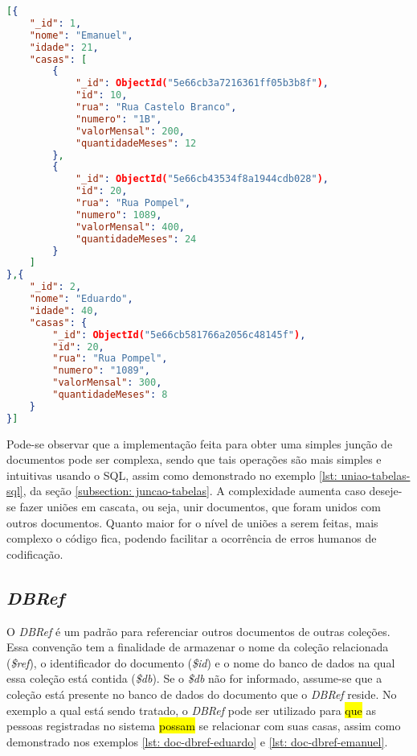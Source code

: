 
\begin{lstlisting}[language=json, caption={Resultado da Junção de Documentos sem Omissão\label{lst: resultado-juncao-lookup-sem-omissao}}]
[{
    "_id": 1,
    "nome": "Emanuel",
    "idade": 21,
    "casas": [
        {
            "_id": ObjectId("5e66cb3a7216361ff05b3b8f"),
            "id": 10,
            "rua": "Rua Castelo Branco",
            "numero": "1B",
            "valorMensal": 200,
            "quantidadeMeses": 12
        },
        {
            "_id": ObjectId("5e66cb43534f8a1944cdb028"),
            "id": 20,
            "rua": "Rua Pompel",
            "numero": 1089,
            "valorMensal": 400,
            "quantidadeMeses": 24
        }
    ]
},{
    "_id": 2,
    "nome": "Eduardo",
    "idade": 40,
    "casas": {
        "_id": ObjectId("5e66cb581766a2056c48145f"),
        "id": 20,
        "rua": "Rua Pompel",
        "numero": "1089",
        "valorMensal": 300,
        "quantidadeMeses": 8
    }
}]
\end{lstlisting}

Pode-se observar que a implementação feita para obter uma simples junção de documentos pode ser complexa, sendo que tais operações são mais simples e intuitivas usando o SQL, assim como demonstrado no exemplo \ref{lst: uniao-tabelas-sql}, da seção \ref{subsection: juncao-tabelas}. A complexidade aumenta caso deseje-se fazer uniões em cascata, ou seja, unir documentos, que foram unidos com outros documentos. Quanto maior for o nível de uniões a serem feitas, mais complexo o código fica, podendo facilitar a ocorrência de erros humanos de codificação.

\subsection{\textit{DBRef}}

O \textit{DBRef} é um padrão para referenciar outros documentos de outras coleções. Essa convenção tem a finalidade de armazenar o nome da coleção relacionada (\textit{\$ref}), o identificador do documento (\textit{\$id}) e o nome do banco de dados na qual essa coleção está contida (\textit{\$db}). Se o \textit{\$db} não for informado, assume-se que a coleção está presente no banco de dados do documento que o \textit{DBRef} reside. No exemplo a qual está sendo tratado, o \textit{DBRef} pode ser utilizado para \hl{que} as pessoas registradas no sistema \hl{possam} se relacionar com suas casas, assim como demonstrado nos exemplos \ref{lst: doc-dbref-eduardo} e \ref{lst: doc-dbref-emanuel}.

